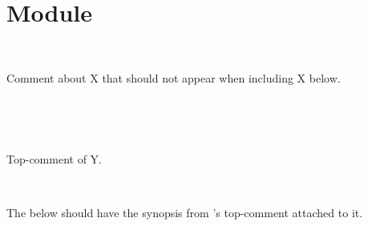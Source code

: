 \section{Module }\label{Include2}%
\label{Include2--module-X}\begin{ocamlindent}\label{Include2-X--type-t}\\
\end{ocamlindent}%
\begin{ocamlindent}Comment about X that should not appear when including X below.\end{ocamlindent}%
\medbreak
{}      \hyperref[Include2-X]{} \label{Include2--type-t}\\
\label{Include2--module-Y}\begin{ocamlindent}\label{Include2-Y--type-t}\\
\end{ocamlindent}%
\begin{ocamlindent}Top-comment of Y.\end{ocamlindent}%
\medbreak
\label{Include2--module-Y_include_synopsis}\begin{ocamlindent}      \hyperref[Include2-Y]{} \label{Include2-Y_include_synopsis--type-t}\\
\end{ocamlindent}%
\begin{ocamlindent}The  below should have the synopsis from 's top-comment attached to it.\end{ocamlindent}%
